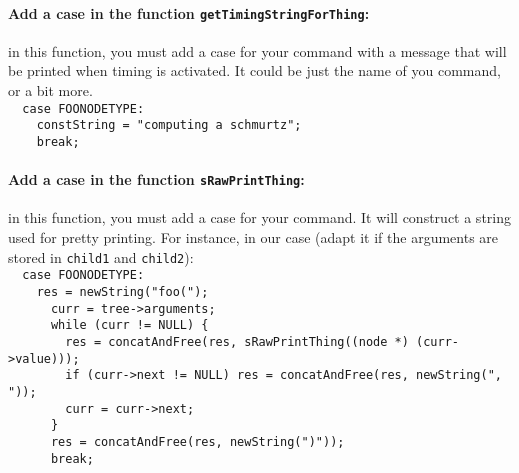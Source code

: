 \documentclass{article}
\newcommand{\commandName}{\texttt{foo}\xspace}
\newcommand{\commandNodeName}{\texttt{FOONODETYPE}\xspace}
\begin{document}
\paragraph{Add a case in the function \texttt{getTimingStringForThing}: } in this function, you must add a case for your command with a message that will be printed when timing is activated. It could be just the name of you command, or a bit more.\\
\phantom{1}\texttt{~~case }\commandNodeName\texttt{:}\\
\phantom{1}\texttt{~~~~constString = "computing a schmurtz";}\\
\phantom{1}\texttt{~~~~break;}\\

\paragraph{Add a case in the function \texttt{sRawPrintThing}: } in this function, you must add a case for your command. It will construct a string used for pretty printing. For instance, in our case (adapt it if the arguments are stored in \texttt{child1} and \texttt{child2}):\\
\phantom{1}\texttt{~~case }\commandNodeName\texttt{:}\\
\phantom{1}\texttt{~~~~res = newString("}\commandName\texttt{(");}\\
\phantom{1}\texttt{~~~~~~curr = tree->arguments;}\\
\phantom{1}\texttt{~~~~~~while (curr != NULL) \{}\\
\phantom{1}\texttt{~~~~~~~~res = concatAndFree(res, sRawPrintThing((node *) (curr->value)));}\\
\phantom{1}\texttt{~~~~~~~~if (curr->next != NULL) res = concatAndFree(res, newString(", ")); }\\
\phantom{1}\texttt{~~~~~~~~curr = curr->next;}\\
\phantom{1}\texttt{~~~~~~\}}\\
\phantom{1}\texttt{~~~~~~res = concatAndFree(res, newString(")"));}\\
\phantom{1}\texttt{~~~~~~break;}\\
\end{document}
